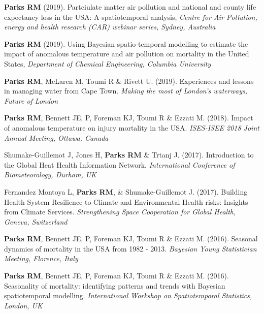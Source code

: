 \noindent \textbf{Parks RM} (2019). Partciulate matter air pollution and national and county life expectancy loss in the USA: A spatiotemporal analysis,  \textit{Centre for Air Pollution, energy and health research (CAR) webinar series, Sydney, Australia} \medskip

\noindent \textbf{Parks RM} (2019). Using Bayesian spatio-temporal modelling to estimate the impact of anomalous temperature and air pollution on mortality in the United States,  \textit{Department of Chemical Engineering, Columbia University} \medskip

\noindent \textbf{Parks RM}, McLaren M, Toumi R \& Rivett U. (2019). Experiences and lessons in managing water from Cape Town. \textit{Making the most of London's waterways, Future of London} \medskip

\noindent \textbf{Parks RM}, Bennett JE, P, Foreman KJ, Toumi R \& Ezzati M. (2018). Impact of anomalous temperature on injury mortality in the USA.  \textit{ISES-ISEE 2018 Joint Annual Meeting, Ottawa, Canada} \medskip

\noindent Shumake-Guillemot J, Jones H, \textbf{Parks RM} \& Trtanj J. (2017). Introduction to the Global Heat Health Information Network.  \textit{International Conference of Biometeorology, Durham, UK} \medskip

\noindent Fernandez Montoya L, \textbf{Parks RM}, \& Shumake-Guillemot J. (2017). Building Health System Resilience to Climate and Environmental Health risks: Insights from Climate Services.  \textit{Strengthening Space Cooperation for Global Health, Geneva, Switzerland} \medskip

\noindent \textbf{Parks RM}, Bennett JE, P, Foreman KJ, Toumi R \& Ezzati M. (2016). Seasonal dynamics of mortality in the USA from 1982 - 2013. \textit{Bayesian Young Statistician Meeting, Florence, Italy} \medskip

\noindent \textbf{Parks RM}, Bennett JE, P, Foreman KJ, Toumi R \& Ezzati M. (2016). Seasonality of mortality: identifying patterns and trends with Bayesian spatiotemporal modelling. \textit{International Workshop on Spatiotemporal Statistics, London, UK}

